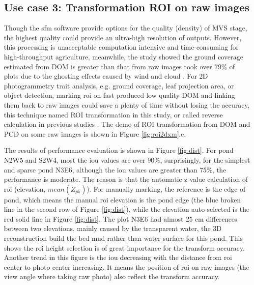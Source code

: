 \documentclass{configs/bmcart}
\begin{document}
\subsection*{Use case 3: Transformation ROI on raw images}
Though the \acrshort*{sfm} software provide options for the quality (density) of MVS stage, the highest quality could provide an ultra-high resolution of outputs. However, this processing is unacceptable computation intensive and time-consuming for high-throughput agriculture, meanwhile, the study showed the ground coverage estimated from DOM is greater than that from raw images took over 79\% of plots due to the ghosting effects caused by wind and cloud \cite{duan_comparison_2017}. For 2D photogrammetry trait analysis, e.g. ground coverage, leaf projection area, or object detection, marking \acrfull*{roi} on fast produced low quality DOM and linking them back to raw images could save a plenty of time without losing the accuracy, this technique named ROI transformation in this study, or called reverse calculation in previous studies \cite{duan_comparison_2017,tresch_easy_2019}. The demo of ROI transformation from DOM and PCD on some raw images is shown in Figure \ref{fig:roi2dxm}.e.

The results of performance evaluation is shown in Figure \ref{fig:dist}. For pond N2W5 and S2W4, most the \acrshort*{iou} values are over 90\%, surprisingly, for the simplest and sparse pond N3E6, although the \acrshort{iou} values are greater than 75\%, the performance is moderate. The reason is that the automatic z value calculation of \acrshort*{roi} (elevation, $mean(Z_{p5})$). For manually marking, the reference is the edge of pond, which means the manual \acrshort*{roi} elevation is the pond edge (the blue broken line in the second row of Figure \ref{fig:dist}), while the elevation auto-selected is the red solid line in Figure \ref{fig:dist}. The plot N3E6 had almost 25 cm differences between two elevations, mainly caused by the transparent water, the 3D reconstruction build the bed mud rather than water surface for this pond. This shows the \acrshort*{roi} height selection is of great importance for the transform accuracy. Another trend in this figure is the \acrshort*{iou} decreasing with the distance from \acrshort*{roi} center to photo center increasing. It means the position of \acrshort*{roi} on raw images (the view angle where taking raw photo) also reflect the transform accuracy. 
\end{document}
